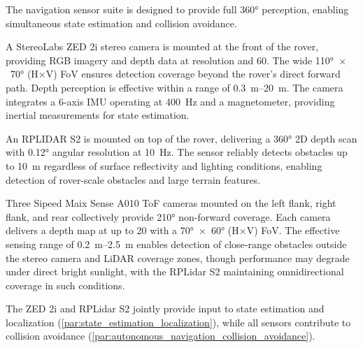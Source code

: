 
The navigation sensor suite is designed to provide full \ang{360} perception, enabling simultaneous state estimation and collision avoidance.

A StereoLabs ZED 2i stereo camera is mounted at the front of the rover, providing RGB imagery and depth data at  resolution and \qty{60}{\fps}. The wide \ang{110}~$\times$~\ang{70} (H$\times$V) FoV ensures detection coverage beyond the rover's direct forward path. Depth perception is effective within a range of \qtyrange{0.3}{20}{\metre}. The camera integrates a 6-axis IMU operating at \qty{400}{\hertz} and a magnetometer, providing inertial measurements for state estimation.

An RPLIDAR S2 is mounted on top of the rover, delivering a \ang{360} 2D depth scan with \ang{0.12} angular resolution at \qty{10}{\hertz}. The sensor reliably detects obstacles up to \qty{10}{\metre} regardless of surface reflectivity and lighting conditions, enabling detection of rover-scale obstacles and large terrain features.

Three Sipeed Maix Sense A010 ToF cameras mounted on the left flank, right flank, and rear collectively provide \ang{210} non-forward coverage. Each camera delivers a  depth map at up to \qty{20}{\fps} with a \ang{70}~$\times$~\ang{60} (H$\times$V) FoV. The effective sensing range of \qtyrange{0.2}{2.5}{\metre} enables detection of close-range obstacles outside the stereo camera and LiDAR coverage zones, though performance may degrade under direct bright sunlight, with the RPLidar S2 maintaining omnidirectional coverage in such conditions.

The ZED 2i and RPLidar S2 jointly provide input to state estimation and localization (\autoref{par:state_estimation_localization}), while all sensors contribute to collision avoidance (\autoref{par:autonomous_navigation_collision_avoidance}).